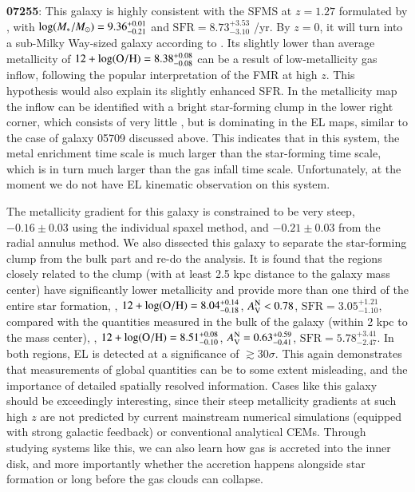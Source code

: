 {\bf 07255}: This galaxy is highly consistent with the SFMS at $z=1.27$ formulated by
\citet{Speagle:2014dd}, with $\log(M_\ast/M_\odot)=9.36_{-0.21}^{+0.01}$ and
$\textrm{SFR}=8.73_{-3.10}^{+3.53}$ \Msun/yr. By $z=0$, it will turn into a sub-Milky
Way-sized galaxy according to \citet{Behroozi:2013fg}.
Its slightly lower than average metallicity of $12+\log({\rm O/H})=8.38_{-0.08}^{+0.08}$ can be a result of
low-metallicity gas inflow, following the popular interpretation of the FMR at high $z$.
This hypothesis would also explain its slightly enhanced SFR.  In the metallicity map the
inflow can be identified with a bright star-forming clump in the lower right corner, which
consists of very little \Mstar, but is dominating in the EL maps, similar to the case of
galaxy 05709 discussed above.  This indicates that in this system, the metal enrichment time
scale is much larger than the star-forming time scale, which is in turn much larger than the
gas infall time scale. Unfortunately, at the moment we do not have EL kinematic observation
on this system.

The metallicity gradient for this galaxy is constrained to be very steep, \ie $-0.16\pm0.03$ using the individual spaxel method,
and $-0.21\pm0.03$ from the radial annulus method.  We also dissected this galaxy to separate the star-forming clump from the bulk
part and re-do the analysis. It is found that the \HII regions closely related to the clump (with at least 2.5 kpc distance to the
galaxy mass center) have significantly lower metallicity and provide more than one third of the entire star formation, \ie,
$12+\log({\rm O/H})=8.04^{+0.14}_{-0.18}$, $A_{\rm V}^{\rm N}<0.78$, $\textrm{SFR}=3.05^{+1.21}_{-1.10}$, compared with the quantities measured in the
bulk of the galaxy (within 2 kpc to the mass center), \ie, $12+\log({\rm O/H})=8.51^{+0.08}_{-0.10}$, $A_{\rm V}^{\rm N}=0.63^{+0.59}_{-0.41}$,
$\textrm{SFR}=5.78^{+3.41}_{-2.47}$.  In both regions, EL \Ha is detected at a significance of $\gtrsim 30\sigma$.  This again
demonstrates that measurements of global quantities can be to some extent misleading, and the importance of detailed spatially
resolved information.  Cases like this galaxy should be exceedingly interesting, since their steep metallicity gradients at such
high $z$ are not predicted by current mainstream numerical simulations (equipped with strong galactic feedback) or conventional
analytical CEMs.  Through studying systems like this, we can also learn how gas is accreted into the inner
disk, and more importantly whether the accretion happens alongside star formation or long
before the gas clouds can collapse.

